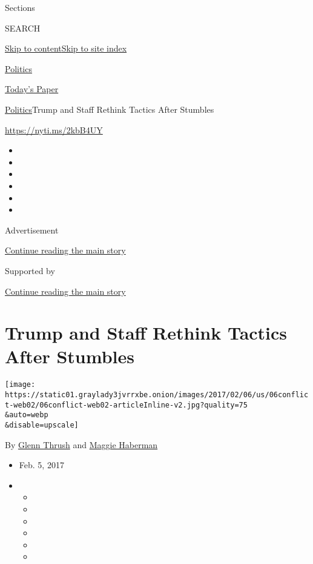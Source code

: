 Sections

SEARCH

\protect\hyperlink{site-content}{Skip to
content}\protect\hyperlink{site-index}{Skip to site index}

\href{https://www.nytimes3xbfgragh.onion/section/politics}{Politics}

\href{https://myaccount.nytimes3xbfgragh.onion/auth/login?response_type=cookie\&client_id=vi}{}

\href{https://www.nytimes3xbfgragh.onion/section/todayspaper}{Today's
Paper}

\href{/section/politics}{Politics}\textbar{}Trump and Staff Rethink
Tactics After Stumbles

\url{https://nyti.ms/2kbB4UY}

\begin{itemize}
\item
\item
\item
\item
\item
\item
\end{itemize}

Advertisement

\protect\hyperlink{after-top}{Continue reading the main story}

Supported by

\protect\hyperlink{after-sponsor}{Continue reading the main story}

\hypertarget{trump-and-staff-rethink-tactics-after-stumbles}{%
\section{Trump and Staff Rethink Tactics After
Stumbles}\label{trump-and-staff-rethink-tactics-after-stumbles}}

\texttt{[image: https://static01.graylady3jvrrxbe.onion/images/2017/02/06/us/06conflict-web02/06conflict-web02-articleInline-v2.jpg?quality=75\\\&auto=webp\\\&disable=upscale]}

By \href{https://www.nytimes3xbfgragh.onion/by/glenn-thrush}{Glenn
Thrush} and
\href{http://www.nytimes3xbfgragh.onion/by/maggie-haberman}{Maggie
Haberman}

\begin{itemize}
\item
  Feb. 5, 2017
\item
  \begin{itemize}
  \item
  \item
  \item
  \item
  \item
  \item
  \end{itemize}
\end{itemize}

